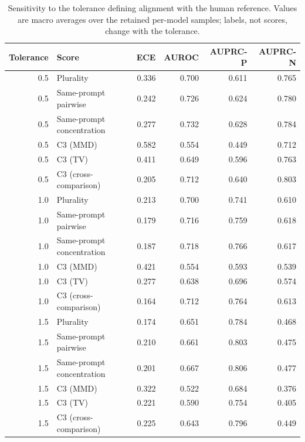\begin{table}[t]
\centering\scriptsize\revisioncolor
\setlength{\tabcolsep}{3pt}
\begin{tabular}{rlrrrr}
\toprule
Tolerance & Score & ECE & AUROC & AUPRC-P & AUPRC-N \\
\midrule
0.5 & Plurality & 0.336 & 0.700 & 0.611 & 0.765 \\
0.5 & Same-prompt pairwise & 0.242 & 0.726 & 0.624 & 0.780 \\
0.5 & Same-prompt concentration & 0.277 & 0.732 & 0.628 & 0.784 \\
0.5 & C3 (MMD) & 0.582 & 0.554 & 0.449 & 0.712 \\
0.5 & C3 (TV) & 0.411 & 0.649 & 0.596 & 0.763 \\
0.5 & C3 (cross-comparison) & 0.205 & 0.712 & 0.640 & 0.803 \\
1.0 & Plurality & 0.213 & 0.700 & 0.741 & 0.610 \\
1.0 & Same-prompt pairwise & 0.179 & 0.716 & 0.759 & 0.618 \\
1.0 & Same-prompt concentration & 0.187 & 0.718 & 0.766 & 0.617 \\
1.0 & C3 (MMD) & 0.421 & 0.554 & 0.593 & 0.539 \\
1.0 & C3 (TV) & 0.277 & 0.638 & 0.696 & 0.574 \\
1.0 & C3 (cross-comparison) & 0.164 & 0.712 & 0.764 & 0.613 \\
1.5 & Plurality & 0.174 & 0.651 & 0.784 & 0.468 \\
1.5 & Same-prompt pairwise & 0.210 & 0.661 & 0.803 & 0.475 \\
1.5 & Same-prompt concentration & 0.201 & 0.667 & 0.806 & 0.477 \\
1.5 & C3 (MMD) & 0.322 & 0.522 & 0.684 & 0.376 \\
1.5 & C3 (TV) & 0.221 & 0.590 & 0.754 & 0.405 \\
1.5 & C3 (cross-comparison) & 0.225 & 0.643 & 0.796 & 0.449 \\
\bottomrule
\end{tabular}
\caption{Sensitivity to the tolerance defining alignment with the human reference. Values are macro averages over the retained per-model samples; labels, not scores, change with the tolerance.}
\label{tab:topic_tolerance}
\end{table}
